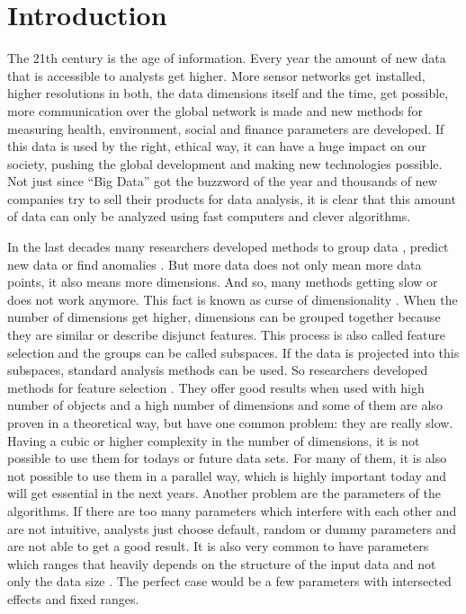 \chapter{Introduction}\label{chap:introduction}
The 21th century is the age of information. Every year the amount of new data that is accessible to analysts get higher. More sensor networks get installed, higher resolutions in both, the data dimensions itself and the time, get possible, more communication over the global network is made and new methods for measuring health, environment, social and finance parameters are developed. If this data is used by the right, ethical way, it can have a huge impact on our society, pushing the global development and making new technologies possible. Not just since ``Big Data'' got the buzzword of the year and thousands of new companies try to sell their products for data analysis, it is clear that this amount of data can only be analyzed using fast computers and clever algorithms.

In the last decades many researchers developed methods to group data \cite{dbscan}, predict new data \cite{c45} or find anomalies \cite{lof}. But more data does not only mean more data points, it also means more dimensions. And so, many methods getting slow or does not work anymore. This fact is known as curse of dimensionality \cite{curse1,curse2}. When the number of dimensions get higher, dimensions can be grouped together because they are similar or describe disjunct features. This process is also called feature selection and the groups can be called subspaces. If the data is projected into this subspaces, standard analysis methods can be used. So researchers developed methods for feature selection \cite{enclus,hics}. They offer good results when used with high number of objects and a high number of dimensions and some of them are also proven in a theoretical way, but have one common problem: they are really slow. Having a cubic or higher complexity in the number of dimensions, it is not possible to use them for todays or future data sets. For many of them, it is also not possible to use them in a parallel way, which is highly important today and will get essential in the next years. Another problem are the parameters of the algorithms. If there are too many parameters which interfere with each other and are not intuitive, analysts just choose default, random or dummy parameters and are not able to get a good result. It is also very common to have parameters which ranges that heavily depends on the structure of the input data and not only the data size \cite{enclus}. The perfect case would be a few parameters with intersected effects and fixed ranges.

